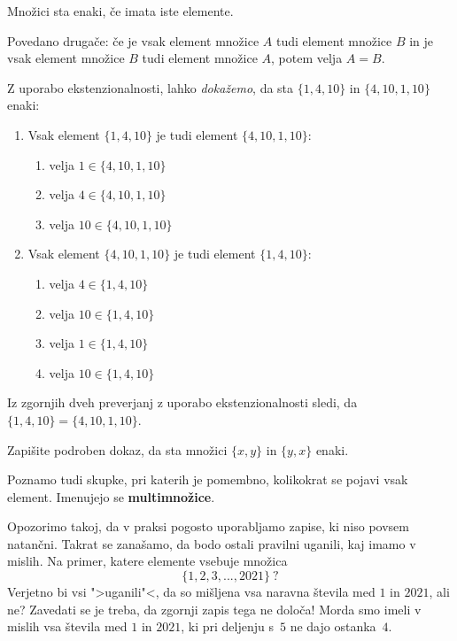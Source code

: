 \begin{aksiom}
  Množici sta enaki, če imata iste elemente.
\end{aksiom}

Povedano drugače: če je vsak element množice $A$ tudi element množice $B$ in je vsak element množice $B$ tudi element množice $A$, potem velja $A = B$.

Z uporabo ekstenzionalnosti, lahko \emph{dokažemo}, da sta $\{1, 4, 10\}$ in $\{4, 10, 1, 10\}$ enaki:
%
\begin{enumerate}
\item 
  Vsak element $\{1, 4, 10\}$ je tudi element $\{4, 10, 1, 10\}$:
  \begin{enumerate}
    \item velja $1 \in \{4, 10, 1, 10\}$
    \item velja $4 \in \{4, 10, 1, 10\}$
    \item velja $10 \in \{4, 10, 1, 10\}$
  \end{enumerate}
\item
Vsak element $\{4, 10, 1, 10\}$ je tudi element $\{1, 4, 10\}$:
  \begin{enumerate}
     \item velja $4 \in \{1, 4, 10\}$
     \item velja $10 \in \{1, 4, 10\}$
     \item velja $1 \in \{1, 4, 10\}$
     \item velja $10 \in \{1, 4, 10\}$
  \end{enumerate}
\end{enumerate}

Iz zgornjih dveh preverjanj z uporabo ekstenzionalnosti sledi, da $\{1, 4, 10\} = \{4, 10, 1, 10\}$.

\begin{naloga}
  Zapišite podroben dokaz, da sta množici $\{x, y\}$ in $\{y, x\}$ enaki.
\end{naloga}

\begin{opomba}
  Poznamo tudi skupke, pri katerih je pomembno, kolikokrat se pojavi vsak element. Imenujejo se \textbf{multimnožice}.
\end{opomba}

Opozorimo takoj, da v praksi pogosto uporabljamo zapise, ki niso povsem natančni. Takrat se zanašamo, da bodo ostali pravilni uganili, kaj imamo v mislih. Na primer, katere elemente vsebuje množica
%
\begin{equation*}
    \{1, 2, 3, ..., 2021\} \ ?
\end{equation*}
%
Verjetno bi vsi ">uganili"<, da so mišljena vsa naravna števila med $1$ in $2021$, ali ne? Zavedati se je treba, da zgornji zapis tega ne določa! Morda smo imeli v mislih vsa števila med $1$ in $2021$, ki pri deljenju s~$5$ ne dajo ostanka~$4$.

